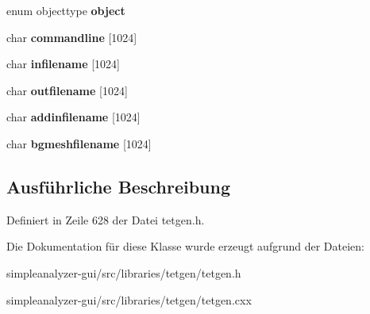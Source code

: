 \begin{DoxyCompactItemize}
\item 
\hypertarget{classtetgenbehavior_a353935d1a081b67fba44c1a630c36ccb}{enum objecttype {\bfseries object}}\label{classtetgenbehavior_a353935d1a081b67fba44c1a630c36ccb}

\item 
\hypertarget{classtetgenbehavior_a56dcfc2ab395c63b7f99d84b2cd1f4e8}{char {\bfseries commandline} \mbox{[}1024\mbox{]}}\label{classtetgenbehavior_a56dcfc2ab395c63b7f99d84b2cd1f4e8}

\item 
\hypertarget{classtetgenbehavior_ac879f6843038d5428199079c515ce6e6}{char {\bfseries infilename} \mbox{[}1024\mbox{]}}\label{classtetgenbehavior_ac879f6843038d5428199079c515ce6e6}

\item 
\hypertarget{classtetgenbehavior_aa066e0b8f2b5b3d0f9e5c6b74e8eadc4}{char {\bfseries outfilename} \mbox{[}1024\mbox{]}}\label{classtetgenbehavior_aa066e0b8f2b5b3d0f9e5c6b74e8eadc4}

\item 
\hypertarget{classtetgenbehavior_a627804470698cc1883fd93999727e334}{char {\bfseries addinfilename} \mbox{[}1024\mbox{]}}\label{classtetgenbehavior_a627804470698cc1883fd93999727e334}

\item 
\hypertarget{classtetgenbehavior_ae72a1c6b8d7389d4fad21fa584207aba}{char {\bfseries bgmeshfilename} \mbox{[}1024\mbox{]}}\label{classtetgenbehavior_ae72a1c6b8d7389d4fad21fa584207aba}

\end{DoxyCompactItemize}


\subsection{Ausführliche Beschreibung}


Definiert in Zeile 628 der Datei tetgen.\-h.



Die Dokumentation für diese Klasse wurde erzeugt aufgrund der Dateien\-:\begin{DoxyCompactItemize}
\item 
simpleanalyzer-\/gui/src/libraries/tetgen/tetgen.\-h\item 
simpleanalyzer-\/gui/src/libraries/tetgen/tetgen.\-cxx\end{DoxyCompactItemize}
